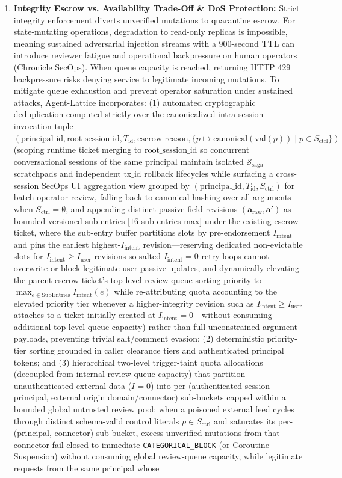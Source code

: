 \documentclass[conference,10pt]{IEEEtran}
\begin{document}
\begin{enumerate}
    \item \textbf{Integrity Escrow vs. Availability Trade-Off \& DoS Protection:} Strict integrity enforcement diverts unverified mutations to quarantine escrow. For state-mutating operations, degradation to read-only replicas is impossible, meaning sustained adversarial injection streams with a 900-second TTL can introduce reviewer fatigue and operational backpressure on human operators (Chronicle SecOps). When queue capacity is reached, returning HTTP 429 backpressure risks denying service to legitimate incoming mutations. To mitigate queue exhaustion and prevent operator saturation under sustained attacks, Agent-Lattice incorporates: (1) automated cryptographic deduplication computed strictly over the canonicalized intra-session invocation tuple $(\text{principal\_id}, \text{root\_session\_id}, T_{\text{id}}, \text{escrow\_reason}, \{p \mapsto \text{canonical}(\text{val}(p)) \mid p \in S_{\text{ctrl}}\})$ (scoping runtime ticket merging to $\text{root\_session\_id}$ so concurrent conversational sessions of the same principal maintain isolated $\mathcal{S}_{\text{saga}}$ scratchpads and independent $\text{tx\_id}$ rollback lifecycles while surfacing a cross-session SecOps UI aggregation view grouped by $(\text{principal\_id}, T_{\text{id}}, S_{\text{ctrl}})$ for batch operator review, falling back to canonical hashing over all arguments when $S_{\text{ctrl}} = \emptyset$, and appending distinct passive-field revisions $(\mathbf{a}_{\text{raw}}, \mathbf{a}')$ as bounded versioned sub-entries [$16$ sub-entries max] under the existing escrow ticket, where the sub-entry buffer partitions slots by pre-endorsement $I_{\text{intent}}$ and pins the earliest highest-$I_{\text{intent}}$ revision---reserving dedicated non-evictable slots for $I_{\text{intent}} \ge I_{\text{user}}$ revisions so salted $I_{\text{intent}} = 0$ retry loops cannot overwrite or block legitimate user passive updates, and dynamically elevating the parent escrow ticket's top-level review-queue sorting priority to $\max_{e \in \text{SubEntries}} I_{\text{intent}}(e)$ while re-attributing quota accounting to the elevated priority tier whenever a higher-integrity revision such as $I_{\text{intent}} \ge I_{\text{user}}$ attaches to a ticket initially created at $I_{\text{intent}} = 0$---without consuming additional top-level queue capacity) rather than full unconstrained argument payloads, preventing trivial salt/comment evasion; (2) deterministic priority-tier sorting grounded in caller clearance tiers and authenticated principal tokens; and (3) hierarchical two-level trigger-taint quota allocations (decoupled from internal review queue capacity) that partition unauthenticated external data ($I = 0$) into per-(authenticated session principal, external origin domain/connector) sub-buckets capped within a bounded global untrusted review pool: when a poisoned external feed cycles through distinct schema-valid control literals $p \in S_{\text{ctrl}}$ and saturates its per-(principal, connector) sub-bucket, excess unverified mutations from that connector fail closed to immediate \texttt{CATEGORICAL\_BLOCK} (or Coroutine Suspension) without consuming global review-queue capacity, while legitimate requests from the same principal whose 
\end{enumerate}
\end{document}
